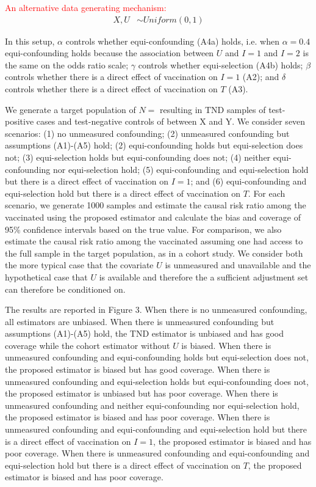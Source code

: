 \documentclass[11pt]{article}
\newcommand{\ken}{\textcolor{red}}
\begin{document}
\ken{An alternative data generating mechanism:}
\begin{align*}
    X,U &\sim Uniform(0,1)
\end{align*}


    
In this setup, $\alpha$ controls whether equi-confounding (A4a) holds, i.e. when $\alpha = 0.4$ equi-confounding holds because the association between $U$ and $I=1$ and $I=2$ is the same on the odds ratio scale; $\gamma$ controls whether equi-selection (A4b) holds; $\beta$ controls whether there is a direct effect of vaccination on $I = 1$ (A2); and $\delta$ controls whether there is a direct effect of vaccination on $T$ (A3).

We generate a target population of $N = $ resulting in TND samples of test-positive cases and test-negative controls of between X and Y. We consider seven scenarios: (1) no unmeasured confounding; (2) unmeasured confounding but assumptions (A1)-(A5) hold; (2) equi-confounding holds but equi-selection does not; (3) equi-selection holds but equi-confounding does not; (4) neither equi-confounding nor equi-selection hold; (5) equi-confounding and equi-selection hold but there is a direct effect of vaccination on $I = 1$; and (6) equi-confounding and equi-selection hold but there is a direct effect of vaccination on $T$. For each scenario, we generate 1000 samples and estimate the causal risk ratio among the vaccinated using the proposed estimator and calculate the bias and coverage of 95\% confidence intervals based on the true value. For comparison, we also estimate the causal risk ratio among the vaccinated assuming one had access to the full sample in the target population, as in a cohort study. We consider both the more typical case that the covariate $U$ is unmeasured and unavailable and the hypothetical case that $U$ is available and therefore the a sufficient adjustment set can therefore be conditioned on. 

The results are reported in Figure 3. When there is no unmeasured confounding, all estimators are unbiased. When there is unmeasured confounding but assumptions (A1)-(A5) hold, the TND estimator is unbiased and has good coverage while the cohort estimator without $U$ is biased. When there is unmeasured confounding and equi-confounding holds but equi-selection does not, the proposed estimator is biased but has good coverage. When there is unmeasured confounding and equi-selection holds but equi-confounding does not, the proposed estimator is unbiased but has poor coverage. When there is unmeasured confounding and neither equi-confounding nor equi-selection hold, the proposed estimator is biased and has poor coverage. When there is unmeasured confounding and equi-confounding and equi-selection hold but there is a direct effect of vaccination on $I = 1$, the proposed estimator is biased and has poor coverage. When there is unmeasured confounding and equi-confounding and equi-selection hold but there is a direct effect of vaccination on $T$, the proposed estimator is biased and has poor coverage.
\end{document}
